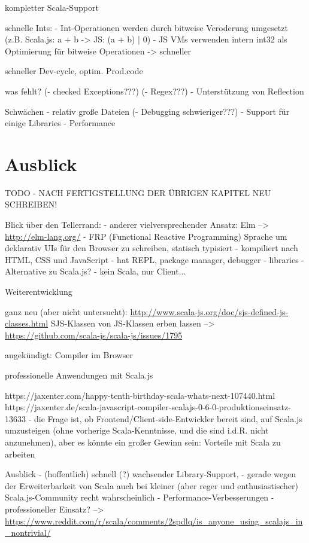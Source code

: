 \documentclass[a4paper, 12pt, listof=totoc, bibliography=totoc]{scrreprt}
\begin{document}
  kompletter Scala-Support
  
  schnelle Ints:
  - Int-Operationen werden durch bitweise Veroderung umgesetzt (z.B. Scala.js: a + b -> JS: (a + b) | 0)
  - JS VMs verwenden intern int32 als Optimierung für bitweise Operationen
  -> schneller\cite{doeraene2015.SSP}


  schneller Dev-cycle, optim. Prod.code
  
  
was fehlt?
  (- checked Exceptions???)
  (- Regex???)
  - Unterstützung von Reflection

Schwächen
  - relativ große Dateien
  (- Debugging schwieriger???)
  - Support für einige Libraries
  - Performance




\section{Ausblick}

TODO - NACH FERTIGSTELLUNG DER ÜBRIGEN KAPITEL NEU SCHREIBEN!

Blick über den Tellerrand:
- anderer vielversprechender Ansatz: Elm
	-->  \url{http://elm-lang.org/}
	- FRP (Functional Reactive Programming) Sprache um deklarativ UIs für den Browser zu schreiben, statisch typisiert
	- kompiliert nach HTML, CSS und JavaScript
	- hat REPL, package manager, debugger
	- libraries
	- Alternative zu Scala.js? - kein Scala, nur Client...



Weiterentwicklung

	ganz neu (aber nicht untersucht): \url{http://www.scala-js.org/doc/sjs-defined-js-classes.html}
	SJS-Klassen von JS-Klassen erben lassen  -->  \url{https://github.com/scala-js/scala-js/issues/1795}
	
	
	angekündigt: Compiler im Browser\cite{doeraene2014.WHB}
	



professionelle Anwendungen mit Scala.js

		https://jaxenter.com/happy-tenth-birthday-scala-whats-next-107440.html
	https://jaxenter.de/scala-javascript-compiler-scalajs-0-6-0-produktionseinsatz-13633
	- die Frage ist, ob Frontend/Client-side-Entwickler bereit sind, auf Scala.js umzusteigen (ohne vorherige Scala-Kenntnisse, und die sind i.d.R. nicht anzunehmen), aber es könnte ein großer Gewinn sein: Vorteile mit Scala zu arbeiten\cite{doeraene2013.CSJ}




Ausblick
  - (hoffentlich) schnell (?) wachsender Library-Support, 
     	- gerade wegen der Erweiterbarkeit von Scala auch bei kleiner (aber reger und enthusiastischer) Scala.js-Community  recht wahrscheinlich
  - Performance-Verbesserungen
  - professioneller Einsatz?
    -->  \url{https://www.reddit.com/r/scala/comments/2spdlq/is_anyone_using_scalajs_in_nontrivial/}
\end{document}

